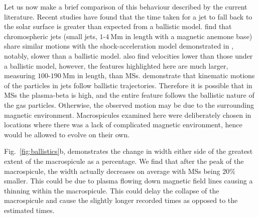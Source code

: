 Let us now make a brief comparison of this behaviour described by the current literature. Recent studies have found that the time taken for a jet to fall back to the solar surface is greater than expected from a ballistic model. \cite{Nishizuka2011} find that chromospheric jets (small jets, $1$-$4\ \textrm{Mm}$ in length with a magnetic anemone base) share similar motions with the shock-acceleration model demonstrated in \cite{ShibataSuematsu1982}, notably, slower than a ballistic model. \cite{Moschou2013} also find velocities lower than those under a ballistic model, however, the features highlighted here are much larger, measuring $100$-$190\ \textrm{Mm}$ in length, than MSs. \cite{Feng2012} demonstrate that kinematic motions of the particles in jets follow ballistic trajectories. Therefore it is possible that in MSs the plasma-beta is high, and the entire feature follows the ballistic nature of the gas particles. Otherwise, the observed motion may be due to the surrounding magnetic environment. Macrospicules examined here were deliberately chosen in locations where there was a lack of complicated magnetic environment, hence would be allowed to evolve on their own.



Fig.~\ref{fig:ballistics}b, demonstrates the change in width either side of the greatest extent of the macrospicule as a percentage. We find that after the peak of the macrospicule, the width actually decreases on average with MSs being $20\%$ smaller. This could be due to plasma flowing down magnetic field lines causing a thinning within the macrospicule. This could delay the collapse of the macrospicule and cause the slightly longer recorded times as opposed to the estimated times.       

